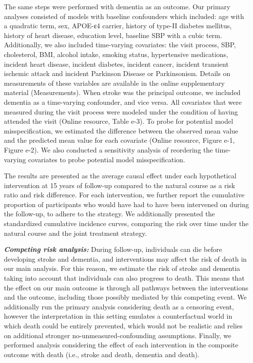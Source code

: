 \documentclass[
]{book}
\begin{document}
The same steps were performed with dementia as an outcome. Our primary analyses consisted of models with baseline confounders which included: age with a quadratic term, sex, APOE-ε4 carrier, history of type-II diabetes mellitus, history of heart disease, education level, baseline SBP with a cubic term. Additionally, we also included time-varying covariates: the visit process, SBP, cholesterol, BMI, alcohol intake, smoking status, hypertensive medications, incident heart disease, incident diabetes, incident cancer, incident transient ischemic attack and incident Parkinson Disease or Parkinsonism. Details on measurements of these variables are available in the online supplementary material (Measurements). When stroke was the principal outcome, we included dementia as a time-varying confounder, and vice versa. All covariates that were measured during the visit process were modeled under the condition of having attended the visit (Online resource, Table e-3). To probe for potential model misspecification, we estimated the difference between the observed mean value and the predicted mean value for each covariate (Online resource, Figure e-1, Figure e-2). We also conducted a sensitivity analysis of reordering the time-varying covariates to probe potential model misspecification.

The results are presented as the average causal effect under each hypothetical intervention at 15 years of follow-up compared to the natural course as a risk ratio and risk difference. For each intervention, we further report the cumulative proportion of participants who would have had to have been intervened on during the follow-up, to adhere to the strategy. We additionally presented the standardized cumulative incidence curves, comparing the risk over time under the natural course and the joint treatment strategy.

\textbf{\emph{Competing risk analysis:}} During follow-up, individuals can die before developing stroke and dementia, and interventions may affect the risk of death in our main analysis. For this reason, we estimate the risk of stroke and dementia taking into account that individuals can also progress to death. This means that the effect on our main outcome is through all pathways between the interventions and the outcome, including those possibly mediated by this competing event. We additionally run the primary analysis considering death as a censoring event, however the interpretation in this setting emulates a counterfactual world in which death could be entirely prevented, which would not be realistic and relies on additional stronger no-unmeasured-confounding assumptions\autocite{young2020}. Finally, we performed analysis considering the effect of each intervention in the composite outcome with death (i.e., stroke and death, dementia and death).
\end{document}

